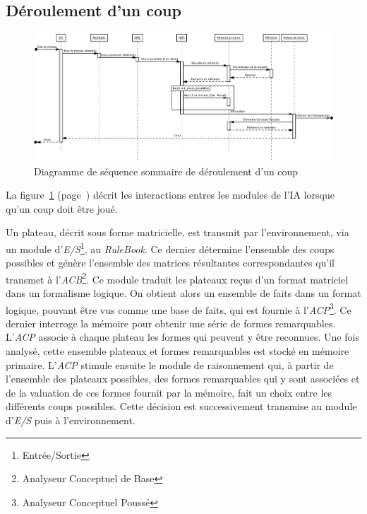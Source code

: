 \subsection{Déroulement d'un coup}
\label{deroulement_dun_coup}

\begin{figure}[p]
\centering
\includegraphics[width=0.9\textheight,angle=90]{files/analyse/sequence}
\caption{Diagramme de séquence sommaire de déroulement d'un coup}
\label{diag_sequence_coup}
\end{figure}

La figure~\ref{diag_sequence_coup} (page~\pageref{diag_sequence_coup}) décrit les interactions entres les modules de l'IA lorsque qu'un coup doit être joué.

Un plateau, décrit sous forme matricielle, est transmit par l'environnement, via un module d'\emph{E/S}\footnote{Entrée/Sortie}, au \emph{RuleBook}. Ce dernier détermine l'ensemble des coups possibles et génère l'ensemble des matrices résultantes correspondantes qu'il transmet à l'\emph{ACB}\footnote{Analyseur Conceptuel de Base}. Ce module traduit les plateaux reçus d'un format matriciel dans un formalisme logique. On obtient alors un ensemble de faits dans un format logique, pouvant être vus comme une base de faits, qui est fournie à l'\emph{ACP}\footnote{Analyseur Conceptuel Poussé}. Ce dernier interroge la mémoire pour obtenir une série de formes remarquables. L'\emph{ACP} associe à chaque plateau les formes qui peuvent y être reconnues. Une fois analysé, cette ensemble plateaux et formes remarquables est stocké en mémoire primaire. L'\emph{ACP} stimule ensuite le module de raisonnement qui, à partir de l'ensemble des plateaux possibles, des formes remarquables qui y sont associées et de la valuation de ces formes fournit par la mémoire, fait un choix entre les différents coups possibles. Cette décision est successivement transmise au module d'\emph{E/S} puis à l'environnement.
